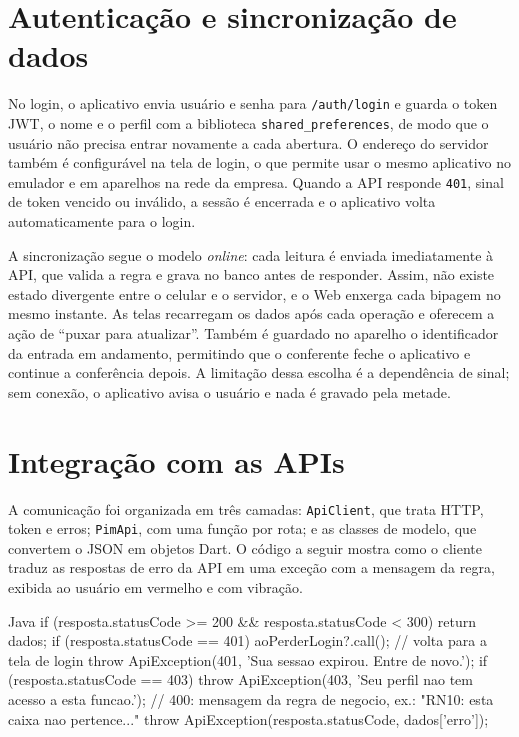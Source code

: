 \section{Autenticação e sincronização de dados}

No login, o aplicativo envia usuário e senha para \texttt{/auth/login} e guarda o token JWT, o nome e o perfil com a biblioteca \texttt{shared\_preferences}, de modo que o usuário não precisa entrar novamente a cada abertura. O endereço do servidor também é configurável na tela de login, o que permite usar o mesmo aplicativo no emulador e em aparelhos na rede da empresa. Quando a API responde \texttt{401}, sinal de token vencido ou inválido, a sessão é encerrada e o aplicativo volta automaticamente para o login.

A sincronização segue o modelo \textit{online}: cada leitura é enviada imediatamente à API, que valida a regra e grava no banco antes de responder. Assim, não existe estado divergente entre o celular e o servidor, e o Web enxerga cada bipagem no mesmo instante. As telas recarregam os dados após cada operação e oferecem a ação de ``puxar para atualizar''. Também é guardado no aparelho o identificador da entrada em andamento, permitindo que o conferente feche o aplicativo e continue a conferência depois. A limitação dessa escolha é a dependência de sinal; sem conexão, o aplicativo avisa o usuário e nada é gravado pela metade.

\section{Integração com as APIs}

A comunicação foi organizada em três camadas: \texttt{ApiClient}, que trata HTTP, token e erros; \texttt{PimApi}, com uma função por rota; e as classes de modelo, que convertem o JSON em objetos Dart. O código a seguir mostra como o cliente traduz as respostas de erro da API em uma exceção com a mensagem da regra, exibida ao usuário em vermelho e com vibração.

\begin{codeblock}{Java}
if (resposta.statusCode >= 200 && resposta.statusCode < 300) return dados;
if (resposta.statusCode == 401) {
  aoPerderLogin?.call();   // volta para a tela de login
  throw ApiException(401, 'Sua sessao expirou. Entre de novo.');
}
if (resposta.statusCode == 403) {
  throw ApiException(403, 'Seu perfil nao tem acesso a esta funcao.');
}
// 400: mensagem da regra de negocio, ex.: "RN10: esta caixa nao pertence..."
throw ApiException(resposta.statusCode, dados['erro']);
\end{codeblock}
